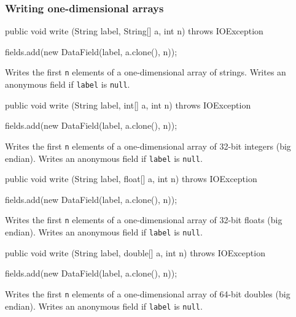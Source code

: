 \subsubsection*{Writing one-dimensional arrays}

\begin{code}
   public void write (String label, String[] a, int n) throws IOException \begin{hide} {
      fields.add(new DataField(label, a.clone(), n));
   }
   \end{hide}
\end{code}
\begin{tabb}
Writes the first \texttt{n} elements of a one-dimensional array
of strings.
Writes an anonymous field if \texttt{label} is \texttt{null}.
\end{tabb}
\begin{code}

   public void write (String label, int[] a, int n) throws IOException \begin{hide} {
      fields.add(new DataField(label, a.clone(), n));
   }
   \end{hide}
\end{code}
\begin{tabb}
Writes the first \texttt{n} elements of a one-dimensional array
of 32-bit integers (big endian).
Writes an anonymous field if \texttt{label} is \texttt{null}.
\end{tabb}
\begin{code}

   public void write (String label, float[] a, int n) throws IOException \begin{hide} {
      fields.add(new DataField(label, a.clone(), n));
   }
   \end{hide}
\end{code}
\begin{tabb}
Writes the first \texttt{n} elements of a one-dimensional array
of 32-bit floats (big endian).
Writes an anonymous field if \texttt{label} is \texttt{null}.
\end{tabb}
\begin{code}

   public void write (String label, double[] a, int n) throws IOException \begin{hide} {
      fields.add(new DataField(label, a.clone(), n));
   }
   \end{hide}
\end{code}
\begin{tabb}
Writes the first \texttt{n} elements of a one-dimensional array
of 64-bit doubles (big endian).
Writes an anonymous field if \texttt{label} is \texttt{null}.
\end{tabb}



